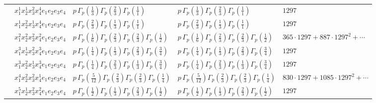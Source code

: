 \documentclass[11pt]{article}
\begin{document}
\begin{table}[ht]
{\begin{tabular}{@{}lllll@{}}
 & $x_{1}^{1} x_{2}^{1} x_{3}^{2} x_{4}^{4}  e_{1} e_{2} e_{3} e_{4}$ & $p \, \Gamma_p \left( \frac{1}{3} \right) \Gamma_p \left( \frac{2}{3} \right) \Gamma_p \left( \frac{1}{1} \right)$ & $p \, \Gamma_p \left( \frac{1}{3} \right) \Gamma_p \left( \frac{2}{3} \right) \Gamma_p \left( \frac{1}{1} \right)$ & $1297$ \\
 & $x_{1}^{1} x_{2}^{2} x_{3}^{1} x_{4}^{4}  e_{1} e_{2} e_{3} e_{4}$ & $p \, \Gamma_p \left( \frac{2}{3} \right) \Gamma_p \left( \frac{1}{3} \right) \Gamma_p \left( \frac{1}{1} \right)$ & $p \, \Gamma_p \left( \frac{2}{3} \right) \Gamma_p \left( \frac{1}{3} \right) \Gamma_p \left( \frac{1}{1} \right)$ & $1297$ \\
 & $x_{1}^{2} x_{2}^{2} x_{3}^{2} x_{4}^{2}  e_{1} e_{2} e_{3} e_{4}$ & $p \, \Gamma_p \left( \frac{1}{6} \right) \Gamma_p \left( \frac{2}{3} \right) \Gamma_p \left( \frac{2}{3} \right) \Gamma_p \left( \frac{1}{2} \right)$ & $p \, \Gamma_p \left( \frac{1}{6} \right) \Gamma_p \left( \frac{2}{3} \right) \Gamma_p \left( \frac{2}{3} \right) \Gamma_p \left( \frac{1}{2} \right)$ & $365{\cdot}1297{+}887{\cdot}1297^{2}{+}\cdots$ \\
 & $x_{1}^{3} x_{2}^{1} x_{3}^{2} x_{4}^{3}  e_{1} e_{2} e_{3} e_{4}$ & $p \, \Gamma_p \left( \frac{1}{4} \right) \Gamma_p \left( \frac{1}{3} \right) \Gamma_p \left( \frac{2}{3} \right) \Gamma_p \left( \frac{3}{4} \right)$ & $p \, \Gamma_p \left( \frac{1}{4} \right) \Gamma_p \left( \frac{1}{3} \right) \Gamma_p \left( \frac{2}{3} \right) \Gamma_p \left( \frac{3}{4} \right)$ & $1297$ \\
 & $x_{1}^{3} x_{2}^{2} x_{3}^{1} x_{4}^{3}  e_{1} e_{2} e_{3} e_{4}$ & $p \, \Gamma_p \left( \frac{1}{4} \right) \Gamma_p \left( \frac{2}{3} \right) \Gamma_p \left( \frac{1}{3} \right) \Gamma_p \left( \frac{3}{4} \right)$ & $p \, \Gamma_p \left( \frac{1}{4} \right) \Gamma_p \left( \frac{2}{3} \right) \Gamma_p \left( \frac{1}{3} \right) \Gamma_p \left( \frac{3}{4} \right)$ & $1297$ \\
 & $x_{1}^{4} x_{2}^{2} x_{3}^{2} x_{4}^{1}  e_{1} e_{2} e_{3} e_{4}$ & $p \, \Gamma_p \left( \frac{5}{12} \right) \Gamma_p \left( \frac{2}{3} \right) \Gamma_p \left( \frac{2}{3} \right) \Gamma_p \left( \frac{1}{4} \right)$ & $p \, \Gamma_p \left( \frac{5}{12} \right) \Gamma_p \left( \frac{2}{3} \right) \Gamma_p \left( \frac{2}{3} \right) \Gamma_p \left( \frac{1}{4} \right)$ & $830{\cdot}1297{+}1085{\cdot}1297^{2}{+}\cdots$ \\
 & $x_{1}^{5} x_{2}^{1} x_{3}^{2} x_{4}^{2}  e_{1} e_{2} e_{3} e_{4}$ & $p \, \Gamma_p \left( \frac{1}{2} \right) \Gamma_p \left( \frac{1}{3} \right) \Gamma_p \left( \frac{2}{3} \right) \Gamma_p \left( \frac{1}{2} \right)$ & $p \, \Gamma_p \left( \frac{1}{2} \right) \Gamma_p \left( \frac{1}{3} \right) \Gamma_p \left( \frac{2}{3} \right) \Gamma_p \left( \frac{1}{2} \right)$ & $1297$ \\

\end{tabular}}
\end{table}
\end{document}
